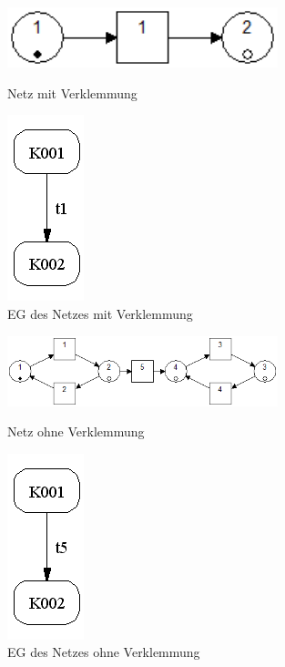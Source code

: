 \documentclass[10pt]{scrartcl}
\begin{document}
\begin{enumerate}
\begin{figure}
\begin{minipage}[hbt]{7cm}
	\centering
	\includegraphics[width=0.7\textwidth]{Bilder/36_Verklemmung_KG_Netz.png}
	\caption{Netz mit Verklemmung}
	\label{fig:VKGN}
\end{minipage}
\hfill
\begin{minipage}[hbt]{7cm}
	\centering
	\includegraphics[height=0.5\textwidth]{Bilder/36_Verklemmung_KG_Graph.png}
	\caption{EG des Netzes mit Verklemmung}
	\label{fig:VKGG}
\end{minipage}
\end{figure}
\begin{figure}
\begin{minipage}[hbt]{7cm}
	\centering
	\includegraphics[width=0.7\textwidth]{Bilder/36_keine_Verklemmung_KG_Netz.png}
	\caption{Netz ohne Verklemmung}
	\label{fig:nVKGN}
\end{minipage}
\hfill
\begin{minipage}[hbt]{7cm}
	\centering
	\includegraphics[height=0.5\textwidth]{Bilder/36_keine_Verklemmung_KG_Graph.png}
	\caption{EG des Netzes ohne Verklemmung}
	\label{fig:nVKGG}
\end{minipage}
\end{figure}

\end{enumerate}
\end{document}
